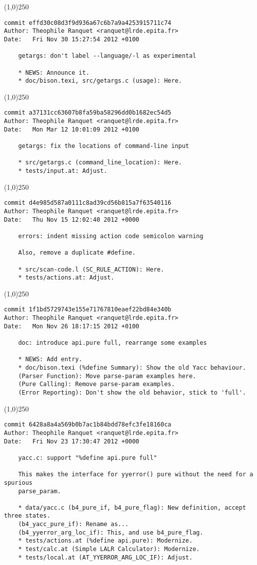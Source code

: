 \line(1,0){250}
\begin{verbatim}
commit effd30c08d3f9d936a67c6b7a9a4253915711c74
Author: Theophile Ranquet <ranquet@lrde.epita.fr>
Date:   Fri Nov 30 15:27:54 2012 +0100

    getargs: don't label --language/-l as experimental
    
    * NEWS: Announce it.
    * doc/bison.texi, src/getargs.c (usage): Here.

\end{verbatim}
\line(1,0){250}
\begin{verbatim}
commit a37131cc63607b8fa59ba58296dd0b1682ec54d5
Author: Theophile Ranquet <ranquet@lrde.epita.fr>
Date:   Mon Mar 12 10:01:09 2012 +0100

    getargs: fix the locations of command-line input
    
    * src/getargs.c (command_line_location): Here.
    * tests/input.at: Adjust.

\end{verbatim}
\line(1,0){250}
\begin{verbatim}
commit d4e985d587a0111c8ad39cd56b815a7f63540116
Author: Theophile Ranquet <ranquet@lrde.epita.fr>
Date:   Thu Nov 15 12:02:40 2012 +0000

    errors: indent missing action code semicolon warning
    
    Also, remove a duplicate #define.
    
    * src/scan-code.l (SC_RULE_ACTION): Here.
    * tests/actions.at: Adjust.

\end{verbatim}
\line(1,0){250}
\begin{verbatim}
commit 1f1bd5729743e155e71767810eaef22bd84e340b
Author: Theophile Ranquet <ranquet@lrde.epita.fr>
Date:   Mon Nov 26 18:17:15 2012 +0100

    doc: introduce api.pure full, rearrange some examples
    
    * NEWS: Add entry.
    * doc/bison.texi (%define Summary): Show the old Yacc behaviour.
    (Parser Function): Move parse-param examples here.
    (Pure Calling): Remove parse-param examples.
    (Error Reporting): Don't show the old behavior, stick to 'full'.

\end{verbatim}
\line(1,0){250}
\begin{verbatim}
commit 6428a8a4a569b0b7ac1b84bdd78efc3fe18160ca
Author: Theophile Ranquet <ranquet@lrde.epita.fr>
Date:   Fri Nov 23 17:30:47 2012 +0000

    yacc.c: support "%define api.pure full"
    
    This makes the interface for yyerror() pure without the need for a spurious
    parse_param.
    
    * data/yacc.c (b4_pure_if, b4_pure_flag): New definition, accept three states.
    (b4_yacc_pure_if): Rename as...
    (b4_yyerror_arg_loc_if): This, and use b4_pure_flag.
    * tests/actions.at (%define api.pure): Modernize.
    * test/calc.at (Simple LALR Calculator): Modernize.
    * tests/local.at (AT_YYERROR_ARG_LOC_IF): Adjust.

\end{verbatim}
